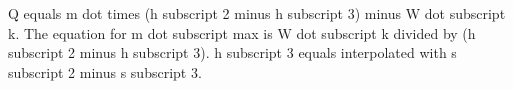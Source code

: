 Q equals m dot times (h subscript 2 minus h subscript 3) minus W dot subscript k. The equation for m dot subscript max is W dot subscript k divided by (h subscript 2 minus h subscript 3). h subscript 3 equals interpolated with s subscript 2 minus s subscript 3.